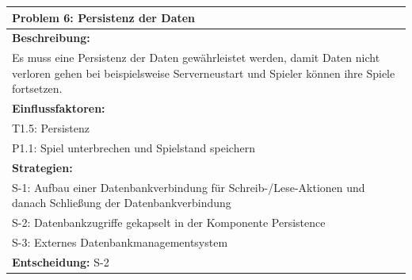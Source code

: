 \documentclass[fontsize=12pt,paper=a4,twoside]{scrartcl}
\begin{document}
\begin{longtable}{|p{15cm}|}
\hline
Problem 6: Persistenz der Daten                                                                           
\\ \hline                                                                                                                                                                                                                                                                                                                                                                                                                                                                                                                                                        
\textbf{Beschreibung:} \\
Es muss eine Persistenz der Daten gewährleistet werden, damit Daten nicht verloren gehen bei beispielsweise Serverneustart und Spieler können ihre Spiele fortsetzen.
\\ \hline
\textbf{Einflussfaktoren:} \\
T1.5: Persistenz \\
P1.1: Spiel unterbrechen und Spielstand speichern
\\ \hline
\textbf{Strategien:} \\
S-1: Aufbau einer Datenbankverbindung für Schreib-/Lese-Aktionen und danach Schließung der Datenbankverbindung\\
S-2: Datenbankzugriffe gekapselt in der Komponente Persistence\\
S-3: Externes Datenbankmanagementsystem
 \\ \hline
 \textbf{Entscheidung:} S-2
\\ \hline
\end{longtable}
\end{document}

